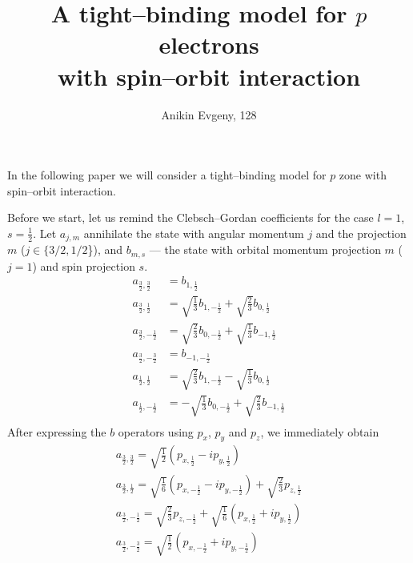 \documentclass{article}
\title{A tight--binding model for $p$ electrons\\ with spin--orbit interaction}
\author{Anikin Evgeny, 128}
\begin{document}
\maketitle

In the following paper we will consider a tight--binding model for $p$ zone with spin--orbit
interaction.

Before we start, let us remind the Clebsch--Gordan coefficients for the case $l = 1$, 
$s = \frac{1}{2}$. Let $a_{j,m}$ annihilate the state with angular momentum $j$
and the projection $m$ ($j \in \{3/2, 1/2$\}), and $b_{m, s}$ --- the state with orbital
momentum projection $m$ ($j = 1$) and spin projection $s$.
\begin{equation}
	\begin{split}
		a_{\frac 32, \frac 32} &= b_{1,\frac 12}\\
		a_{\frac 32, \frac 12} &= \sqrt{\frac 13}b_{1, -\frac 12} 
		    + \sqrt{\frac 23} b_{0, \frac 12}\\
		a_{\frac 32, -\frac 12} &= \sqrt{\frac 23} b_{0, -\frac 12} +
		    	\sqrt{\frac 13}b_{-1, \frac 12} \\
		a_{\frac 32, -\frac 32} &= b_{-1,-\frac 12}\\
		a_{\frac 12, \frac 12} &= \sqrt{\frac 23} b_{1, -\frac 12} -
		    	\sqrt{\frac 13}b_{0, \frac 12} \\
		a_{\frac 12, -\frac 12} &= -\sqrt{\frac 13}b_{0, -\frac 12} 
			+ \sqrt{\frac 23} b_{-1, \frac 12}\\
	\end{split}
\end{equation}
After expressing the $b$ operators using $p_x$, $p_y$ and $p_z$, we immediately obtain
\begin{equation}
	\label{transform1}
	\begin{gathered}
		a_{\frac{3}{2}, \frac{3}{2}} = 
			\sqrt{\frac{1}{2}} \left(p_{x,\frac{1}{2}} - i p_{y,\frac{1}{2}}\right)\\
		a_{\frac{3}{2}, \frac{1}{2}} = 
			\sqrt{\frac{1}{6}} \left(p_{x,-\frac{1}{2}} - i p_{y,-\frac{1}{2}}\right) 
				+ \sqrt{\frac{2}{3}} p_{z, \frac{1}{2}}\\
		a_{\frac{3}{2}, -\frac{1}{2}} = 
			\sqrt{\frac{2}{3}} p_{z, -\frac{1}{2}}+
				\sqrt{\frac{1}{6}} \left(p_{x,\frac{1}{2}} + i p_{y,\frac{1}{2}}\right) \\
		a_{\frac{3}{2}, -\frac{3}{2}} = 
			\sqrt{\frac{1}{2}} \left(p_{x,-\frac{1}{2}} + i p_{y,-\frac{1}{2}}\right)\\
	\end{gathered}
\end{equation}
\end{document}
